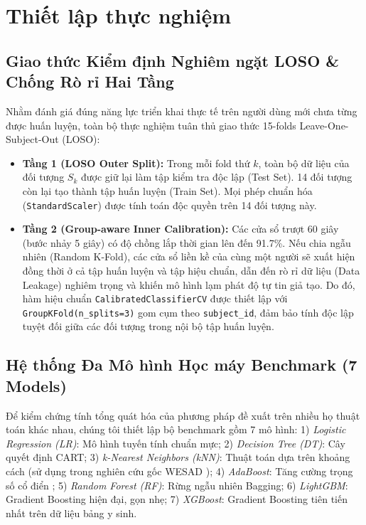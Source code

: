 \documentclass[conference]{IEEEtran}
\begin{document}
\section{Thiết lập thực nghiệm}

\subsection{Giao thức Kiểm định Nghiêm ngặt LOSO \& Chống Rò rỉ Hai Tầng}
Nhằm đánh giá đúng năng lực triển khai thực tế trên người dùng mới chưa từng được huấn luyện, toàn bộ thực nghiệm tuân thủ giao thức 15-folds Leave-One-Subject-Out (LOSO):
\begin{itemize}
    \item \textbf{Tầng 1 (LOSO Outer Split):} Trong mỗi fold thứ $k$, toàn bộ dữ liệu của đối tượng $S_k$ được giữ lại làm tập kiểm tra độc lập (Test Set). 14 đối tượng còn lại tạo thành tập huấn luyện (Train Set). Mọi phép chuẩn hóa (\texttt{StandardScaler}) được tính toán độc quyền trên 14 đối tượng này.
    \item \textbf{Tầng 2 (Group-aware Inner Calibration):} Các cửa sổ trượt 60 giây (bước nhảy 5 giây) có độ chồng lắp thời gian lên đến 91.7\%. Nếu chia ngẫu nhiên (Random K-Fold), các cửa sổ liền kề của cùng một người sẽ xuất hiện đồng thời ở cả tập huấn luyện và tập hiệu chuẩn, dẫn đến rò rỉ dữ liệu (Data Leakage) nghiêm trọng và khiến mô hình lạm phát độ tự tin giả tạo. Do đó, hàm hiệu chuẩn \texttt{CalibratedClassifierCV} được thiết lập với \texttt{GroupKFold(n\_splits=3)} gom cụm theo \texttt{subject\_id}, đảm bảo tính độc lập tuyệt đối giữa các đối tượng trong nội bộ tập huấn luyện.
\end{itemize}

\subsection{Hệ thống Đa Mô hình Học máy Benchmark (7 Models)}
Để kiểm chứng tính tổng quát hóa của phương pháp đề xuất trên nhiều họ thuật toán khác nhau, chúng tôi thiết lập bộ benchmark gồm 7 mô hình:
1) \textit{Logistic Regression (LR)}: Mô hình tuyến tính chuẩn mực;
2) \textit{Decision Tree (DT)}: Cây quyết định CART;
3) \textit{k-Nearest Neighbors (kNN)}: Thuật toán dựa trên khoảng cách (sử dụng trong nghiên cứu gốc WESAD \cite{schmidt2018wesad});
4) \textit{AdaBoost}: Tăng cường trọng số cổ điển \cite{schmidt2018wesad};
5) \textit{Random Forest (RF)}: Rừng ngẫu nhiên Bagging;
6) \textit{LightGBM}: Gradient Boosting hiện đại, gọn nhẹ;
7) \textit{XGBoost}: Gradient Boosting tiên tiến nhất trên dữ liệu bảng y sinh.
\end{document}

